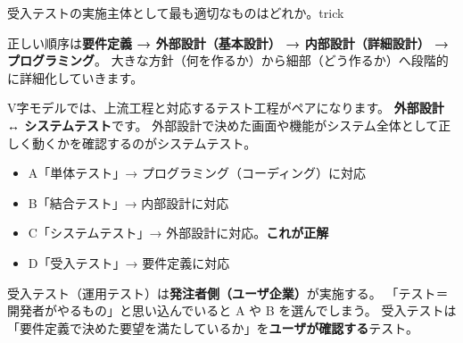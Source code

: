 \begin{mondai}{受入テストの実施主体として最も適切なものはどれか。}{trick}
\end{mondai}

\kaitoupage

\begin{kaisetsu}
正しい順序は\textbf{要件定義 → 外部設計（基本設計） → 内部設計（詳細設計） → プログラミング}。
大きな方針（何を作るか）から細部（どう作るか）へ段階的に詳細化していきます。
\end{kaisetsu}

\begin{kaisetsu}
V字モデルでは、上流工程と対応するテスト工程がペアになります。
\textbf{外部設計 ↔ システムテスト}です。
外部設計で決めた画面や機能がシステム全体として正しく動くかを確認するのがシステムテスト。
\end{kaisetsu}
\begin{goutoubun}
\begin{itemize}
  \item A「単体テスト」→ プログラミング（コーディング）に対応
  \item B「結合テスト」→ 内部設計に対応
  \item C「システムテスト」→ 外部設計に対応。\textbf{これが正解}
  \item D「受入テスト」→ 要件定義に対応
\end{itemize}
\end{goutoubun}

\begin{trickwarn}
受入テスト（運用テスト）は\textbf{発注者側（ユーザ企業）}が実施する。
「テスト＝開発者がやるもの」と思い込んでいると A や B を選んでしまう。
受入テストは「要件定義で決めた要望を満たしているか」を\textbf{ユーザが確認する}テスト。
\end{trickwarn}




\mondaipage
{}

